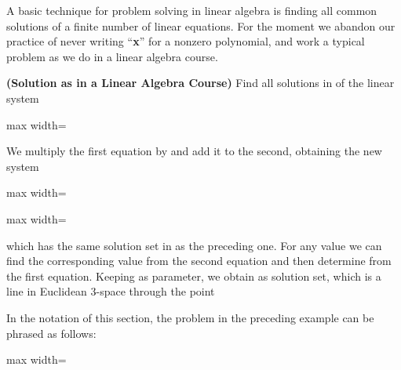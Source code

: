 \documentclass[11pt,oneside]{article}
\begin{document}
\begin{BookBody}

\noindent A basic technique for problem solving in linear algebra is finding all common solutions of a finite number of linear equations. For the moment we abandon our practice of never writing “\textbf{x}” for a nonzero polynomial, and work a typical problem as we do in a linear algebra course.

 \textbf{(Solution as in a Linear Algebra Course)} Find all solutions in  of the linear system

\begin{center}\begin{adjustbox}{max width=\linewidth}\end{adjustbox}\end{center}

 We multiply the first equation by  and add it to the second, obtaining the new system

\begin{center}\begin{adjustbox}{max width=\linewidth}\end{adjustbox}\end{center}

\begin{center}\begin{adjustbox}{max width=\linewidth}\end{adjustbox}\end{center}

\noindent which has the same solution set in  as the preceding one. For any value  we can find the corresponding value from the second equation and then determine  from the first equation. Keeping  as parameter, we obtain  as solution set, which is a line in Euclidean 3-space through the point \BookEnd{\blacktriangle}

In the notation of this section, the problem in the preceding example can be phrased as follows:

\begin{center}\begin{adjustbox}{max width=\linewidth}\end{adjustbox}\end{center}

\end{BookBody}
\end{document}
